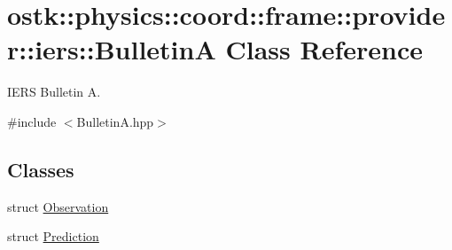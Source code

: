 \hypertarget{classostk_1_1physics_1_1coord_1_1frame_1_1provider_1_1iers_1_1_bulletin_a}{}\section{ostk\+:\+:physics\+:\+:coord\+:\+:frame\+:\+:provider\+:\+:iers\+:\+:BulletinA Class Reference}
\label{classostk_1_1physics_1_1coord_1_1frame_1_1provider_1_1iers_1_1_bulletin_a}


I\+E\+RS Bulletin A.  




{\ttfamily \#include $<$Bulletin\+A.\+hpp$>$}

\subsection*{Classes}
\begin{DoxyCompactItemize}
\item 
struct \hyperlink{structostk_1_1physics_1_1coord_1_1frame_1_1provider_1_1iers_1_1_bulletin_a_1_1_observation}{Observation}
\item 
struct \hyperlink{structostk_1_1physics_1_1coord_1_1frame_1_1provider_1_1iers_1_1_bulletin_a_1_1_prediction}{Prediction}
\end{DoxyCompactItemize}
